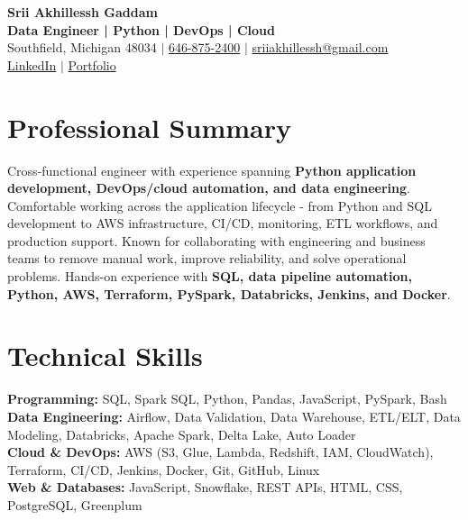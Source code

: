 \documentclass[letterpaper,10pt]{article}
\begin{document}
\fontsize{9.35pt}{10.45pt}\selectfont

\begin{center}
    {\LARGE \textbf{Srii Akhillessh Gaddam}} \\[-1pt]
    \textbf{Data Engineer | Python | DevOps | Cloud} \\[2pt]
    Southfield, Michigan 48034 $|$
    \href{tel:6468752400}{646-875-2400} $|$
    \href{mailto:sriiakhillessh@gmail.com}{sriiakhillessh@gmail.com} \\[1pt]
    \href{https://www.linkedin.com/in/srii-akhiilessh-gaddam-b48668191/}{LinkedIn} $|$
    \href{https://sriiakhillesshg.github.io/portfolio/}{Portfolio}
\end{center}
\vspace{-8pt}

\section{Professional Summary}
\small{Cross-functional engineer with experience spanning \textbf{Python application development, DevOps/cloud automation, and data engineering}. Comfortable working across the application lifecycle - from Python and SQL development to AWS infrastructure, CI/CD, monitoring, ETL workflows, and production support. Known for collaborating with engineering and business teams to remove manual work, improve reliability, and solve operational problems. Hands-on experience with \textbf{SQL, data pipeline automation, Python, AWS, Terraform, PySpark, Databricks, Jenkins, and Docker}.}

\section{Technical Skills}
\small{
\textbf{Programming:} SQL, Spark SQL, Python, Pandas, JavaScript, PySpark, Bash \\
\textbf{Data Engineering:} Airflow, Data Validation, Data Warehouse, ETL/ELT, Data Modeling, Databricks, Apache Spark, Delta Lake, Auto Loader \\
\textbf{Cloud \& DevOps:} AWS (S3, Glue, Lambda, Redshift, IAM, CloudWatch), Terraform, CI/CD, Jenkins, Docker, Git, GitHub, Linux \\
\textbf{Web \& Databases:} JavaScript, Snowflake, REST APIs, HTML, CSS, PostgreSQL, Greenplum
}
\end{document}
